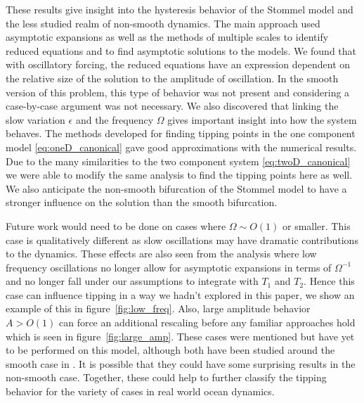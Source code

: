 \indent  These results give insight into the hysteresis behavior of the Stommel model and the less studied realm of non-smooth dynamics. The main approach used asymptotic expansions as well as the methods of multiple scales to identify reduced equations and to find asymptotic solutions to the models. We found that with oscillatory forcing, the reduced equations have an expression dependent on the relative size of the solution to the amplitude of oscillation. In the smooth version of this problem, this type of behavior was not present and considering a case-by-case argument was not necessary. We also discovered that linking the slow variation $\epsilon$ and the frequency $\Omega$ gives important insight into how the system behaves. The methods developed for finding tipping points in the one component model \eqref{eq:oneD_canonical} gave good approximations with the numerical results. Due to the many similarities to the two component system \eqref{eq:twoD_canonical} we were able to modify the same analysis to find the tipping points here as well. We also anticipate the non-smooth bifurcation of the Stommel model to have a stronger influence on the solution than the smooth bifurcation.

\indent Future work would need to be done on cases where $\Omega\sim O(1)$ or smaller. This case is qualitatively different as slow oscillations may have dramatic contributions to the dynamics. These effects are also seen from the analysis where low frequency oscillations no longer allow for asymptotic expansions in terms of $\Omega^{-1}$ and no longer fall under our assumptions to integrate with $T_1$ and $T_2$. Hence this case can influence tipping in a way we hadn't explored in this paper, we show an example of this in figure~\ref{fig:low_freq}. Also, large amplitude behavior $A>O(1)$ can force an additional rescaling before any familiar approaches hold which is seen in figure~\ref{fig:large_amp}. These cases were mentioned but have yet to be performed on this model, although both have been studied around the smooth case in \cite{zhu2015tipping}. It is possible that they could have some surprising results in the non-smooth case. Together, these could help to further classify the tipping behavior for the variety of cases in real world ocean dynamics.

